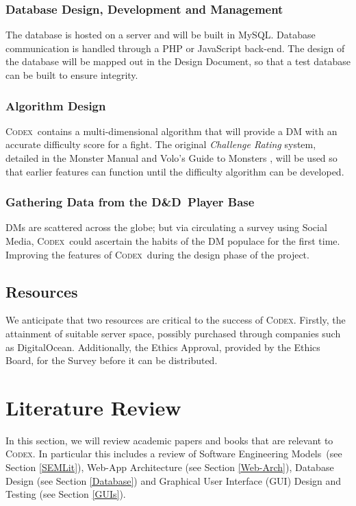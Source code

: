 \documentclass[review]{cmpreport}
\newcommand{\dnd}{D\&D}
\newcommand{\sems}{Software Engineering Models}
\newcommand{\Codex}{\textsc{Codex}}
\begin{document}
	\subsubsection{Database Design, Development and Management}
	The database is hosted on a server and will be built in MySQL. Database communication is handled through a PHP or JavaScript back-end. The design of the database will be mapped out in the Design Document, so that a test database can be built to ensure integrity. 
	
	\subsubsection{Algorithm Design}
	\Codex \ contains a multi-dimensional algorithm that will provide a DM with an accurate difficulty score for a fight. The original \emph{Challenge Rating} system, detailed in the Monster Manual \citep{MonsterManual} and Volo's Guide to Monsters  \citep{Volos}, will be used so that earlier features can function until the difficulty algorithm can be developed. 
	
	\subsubsection{Gathering Data from the \dnd \ Player Base}
	DMs are scattered across the globe; but via circulating a survey using Social Media, \Codex \ could ascertain the habits of the DM populace for the first time. Improving the features of \Codex \ during the design phase of the project.
	
	\subsection{Resources}
	We anticipate that two resources are critical to the success of \Codex. Firstly, the attainment of suitable server space, possibly purchased through companies such as DigitalOcean. Additionally, the Ethics Approval, provided by the Ethics Board, for the Survey before it can be distributed. 
	
	\clearpage
	
	\section{Literature Review}
	In this section, we will review academic papers and books that are relevant to \Codex. In particular this includes a review of \sems \ (see Section \ref{SEMLit}), Web-App Architecture (see Section \ref{Web-Arch}), Database Design (see Section \ref{Database}) and Graphical User Interface (GUI) Design and Testing (see Section \ref{GUIs}).
	
\end{document}
